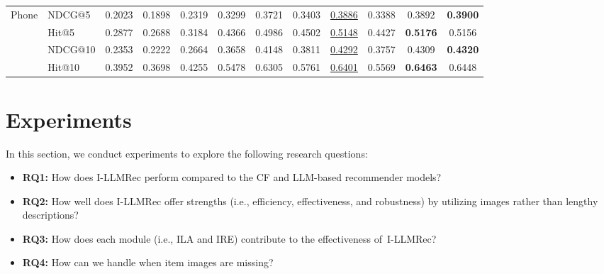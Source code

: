 \documentclass[sigconf]{acmart}
\newcommand{\proposed}{\textsf{I-LLMRec}}
\begin{document}
\begin{table}[t]
{\begin{tabular}{c|l|cccc|ccc|ccc}
\multirow{4}{*}{Phone}   & NDCG@5                                       & 0.2023    & 0.1898   & 0.2319     & 0.3299   & 0.3721                 & 0.3403                   & \underline{0.3886}  & 0.3388               & 0.3892                                  & \textbf{0.3900}          \\
                         & Hit@5                                        & 0.2877    & 0.2688   & 0.3184     & 0.4366   & 0.4986                 & 0.4502                   & \underline{0.5148}  & 0.4427               & \textbf{0.5176}                         & 0.5156                   \\
                         & NDCG@10                                      & 0.2353    & 0.2222   & 0.2664     & 0.3658   & 0.4148                 & 0.3811                   & \underline{0.4292}  & 0.3757               & 0.4309                                  & \textbf{0.4320}          \\
                         & Hit@10                                       & 0.3952    & 0.3698   & 0.4255     & 0.5478   & 0.6305                 & 0.5761                   & \underline{0.6401}  & 0.5569               & \textbf{0.6463}                         & 0.6448                   \\ \bottomrule
\end{tabular}
}
\vspace{-1ex}
\end{table}


\section{Experiments}

In this section, we conduct experiments to explore the following research questions:

\begin{itemize}[leftmargin=5mm]
    \item {\textbf{RQ1:} How does \proposed{} perform compared to the CF and LLM-based recommender models?}
    \item {\textbf{RQ2:} How well does \proposed{} offer strengths (i.e., efficiency, effectiveness, and robustness) by utilizing images rather than lengthy descriptions?}
    \item {\textbf{RQ3:} How does each module (i.e., ILA and IRE) contribute to the effectiveness of~\proposed{}?}
    \item {\textbf{RQ4:} How can we handle when item images are missing?}
\end{itemize}
\end{document}

